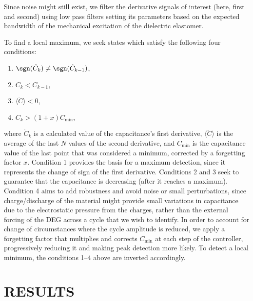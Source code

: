 Since noise might still exist, we filter the derivative signals of interest (here, first and second) using low pass filters setting its parameters based on the expected bandwidth of the mechanical excitation of the dielectric elastomer.

To find a local maximum, we seek states which satisfy the following four conditions:
\begin{enumerate}
\item $\sgn(\dot{C}_k)\neq \sgn(\dot{C}_{k-1})$,
\item $ C_k  < C_{k-1}$,
\item $\langle\ddot{C}\rangle<0$,
\item $C_k>(1+x)C_\text{min}$,
\end{enumerate}
where $\dot{C}_k$ is a calculated value of the capacitance's first derivative, $\langle\ddot{C}\rangle$ is the average of the last $N$ values of the second derivative, and $C_\text{min}$ is the capacitance value of the last point that was considered a minimum, corrected by a forgetting factor $x$. Condition 1 provides the basis for a maximum detection, since it represents the change of sign of the first derivative. Conditions 2 and 3 seek to guarantee that the capacitance is decreasing (after it reaches a maximum). Condition 4 aims to add robustness and avoid noise or small perturbations, since charge/discharge of the material might provide small variations in capacitance due to the electrostatic pressure from the charges, rather than the external forcing of the DEG across a cycle that we wish to identify. In order to account for change of circumstances where the cycle amplitude is reduced, we apply a forgetting factor that multiplies and corrects $C_\text{min}$ at each step of the controller, progressively reducing it and making peak detection more likely. To detect a local minimum, the conditions 1--4 above are inverted accordingly.

\section{RESULTS}

